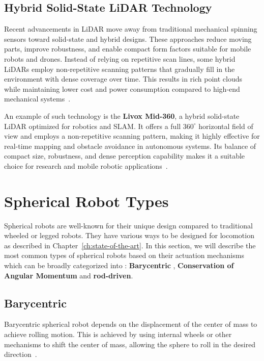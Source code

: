 \documentclass[english, bachelor, utf8]{base/thesis_telematics}
\begin{document}
\subsection{Hybrid Solid-State LiDAR Technology}
Recent advancements in LiDAR move away from traditional mechanical spinning sensors toward solid-state and hybrid designs. 
These approaches reduce moving parts, improve robustness, and enable compact form factors suitable for mobile robots and drones. 
Instead of relying on repetitive scan lines, some hybrid LiDARs employ non-repetitive scanning patterns that gradually fill in the environment with dense coverage over time. 
This results in rich point clouds while maintaining lower cost and power consumption compared to high-end mechanical systems~\cite{globalgps_lidar_types,govcomm_compared}.  

An example of such technology is the \textbf{Livox Mid-360}, a hybrid solid-state LiDAR optimized for robotics and SLAM. 
It offers a full \(360^\circ\) horizontal field of view and employs a non-repetitive scanning pattern, making it highly effective for real-time mapping and obstacle avoidance in autonomous systems. Its balance of compact size, robustness, and dense perception capability makes it a suitable choice for research and mobile robotic applications~\cite{livox_mid360_docs}.

\section{Spherical Robot Types}
\label{sec:spherical-robot-types}
Spherical robots are well-known for their unique design compared to traditional wheeled or legged robots.
They have various ways to be designed for locomotion as described in Chapter~\ref{ch:state-of-the-art}.
In this section, we will describe the most common types of spherical robots based on their actuation mechanisms which can be broadly categorized into : \textbf{Barycentric} , \textbf{Conservation of Angular Momentum} and \textbf{rod-driven}.
\subsection{Barycentric}
Barycentric spherical robot depends on the displacement of the center of mass to achieve rolling motion.
This is achieved by using internal wheels or other mechanisms to shift the center of mass, allowing the sphere to roll in the desired direction~\cite{Aminata}.
\end{document}
